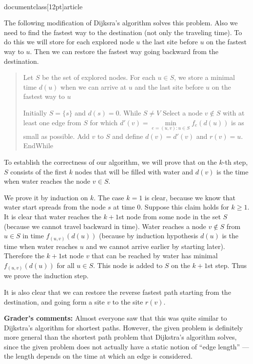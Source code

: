 \\documentclass[12pt]{article}
\begin{document}
\begin{enumerate}
{The following modification of Dijksra's algorithm solves this problem.
Also we need to find the fastest way to the destination (not only the traveling time).
To do this we will store for each explored node $u$ the last
site before $u$ on the fastest way to $u$.
Then we can restore the fastest way
going backward from the destination.



\begin{quote}
\begin{code}
Let $S$ be the set of explored nodes.
  For each $u\in S$, we store a minimal time $d(u)$ when we can arrive at $u$
  and the last site before $u$ on the fastest way to $u$ %

Initially $S=\{s\}$ and $d(s)=0$.
While $S\ne V$
    Select a node $v\notin S$ with at least one edge from $S$ for which
       $d'(v)=\mathop{min}\limits_{e=(u,v):u\in S} f_e(d(u))$ is as small as possible.
    Add $v$ to $S$ and define $d(v)=d'(v)$ and $r(v)=u$.
EndWhile
\end{code}
\end{quote}



To establish the correctness of our algorithm,
we will prove that on the $k$-th step,
$S$ consists of the first $k$ nodes that will be filled with water
and $d(v)$ is the time when water reaches the node $v \in S$.

We prove it by induction on $k$.
The case $k=1$ is clear, because we know that water start spreads from the node $s$ at
time 0.
Suppose this claim holds for $k\ge 1$.
It is clear that water reaches the $k+1$st node from some node in the set $S$
(because we cannot travel backward in time).
Water reaches a node $v\notin S$ from $u\in S$ in
time $f_{(u,v)}(d(u))$ (because by induction hypothesis $d(u)$
is the time when water reaches $u$ and we cannot arrive earlier by starting later).
Therefore the $k+1$st node $v$ that can be reached by water has minimal
$f_{(u,v)}(d(u))$ for all $u\in S$.
This node is added to $S$ on the $k+1$st step.
Thus we prove the induction step.


It is also clear that we can restore the reverse fastest path starting from the
destination, and going form a site $v$ to the site $r(v)$.

\bigskip

{\bf Grader's comments:}
Almost everyone saw that this was quite similar
to Dijkstra's algorithm for shortest paths.
However, the given problem is definitely more
general than the shortest path problem that
Dijkstra's algorithm solves, since the given problem
does not actually have a static notion of ``edge length''
--- the length depends on the time at which an edge is considered.

}
\end{enumerate}
\end{document}
